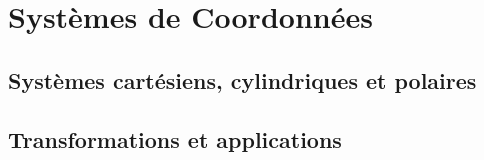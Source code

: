 \chapter{Systèmes de Coordonnées}\label{coord}
\section{Systèmes cartésiens, cylindriques et polaires}\label{coord:systems}
\section{Transformations et applications}\label{coord:trans}
